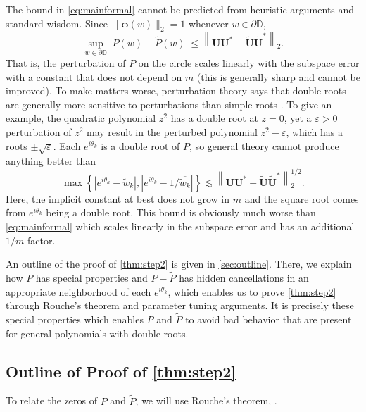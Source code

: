 \documentclass[11pt]{article}
\theoremstyle{definition}
\numberwithin{theorem}{section}
\numberwithin{equation}{section}
\def\D{\mathbb{D}}
\renewcommand{\tilde}{\widetilde}
\renewcommand{\epsilon}{\varepsilon}
\newcommand{\bfU}{{\boldsymbol U}}
\newcommand{\bfphi}{{\boldsymbol \phi}}
\numberwithin{equation}{section}
\begin{document}
The bound in \eqref{eq:mainformal} cannot be predicted from heuristic arguments and standard wisdom. Since $\|\bfphi(w)\|_2=1$ whenever $w\in\partial\D$, 
$$
\sup_{w\in \partial\D} |P(w)-\tilde P(w)|
\leq \left\|\bfU\bfU^*- \tilde \bfU \tilde\bfU^* \right\|_2.
$$
That is, the perturbation of $P$ on the circle scales linearly with the subspace error with a constant that does not depend on $m$ (this is generally sharp and cannot be improved). To make matters worse, perturbation theory says that double roots are generally more sensitive to perturbations than simple roots \cite{simmonds1998first} . To give an example, the quadratic polynomial $z^2$ has a double root at $z=0$, yet a $\epsilon>0$ perturbation of $z^2$ may result in the perturbed polynomial $z^2-\epsilon$, which has a roots $\pm \sqrt \epsilon$. Each $e^{i\theta_k}$ is a double root of $P$, so general theory cannot produce anything better than
$$
\max\left\{ \left| e^{i\theta_k} -\tilde w_k \right|, \left| e^{i\theta_k} - 1/\overline{\tilde w_k}\right| \right\}\lesssim \left\|\bfU\bfU^*- \tilde \bfU \tilde\bfU^* \right\|_2^{1/2}. 
$$
Here, the implicit constant at best does not grow in $m$ and the square root comes from $e^{i\theta_k}$ being a double root. This bound is obviously much worse than \eqref{eq:mainformal} which scales linearly in the subspace error and has an additional $1/m$ factor. 

An outline of the proof of \cref{thm:step2} is given in \cref{sec:outline}. There, we explain how $P$ has special properties and $P-\tilde P$ has hidden cancellations in an appropriate neighborhood of each $e^{i\theta_k}$, which enables us to prove \cref{thm:step2} through Rouche's theorem and parameter tuning arguments. It is precisely these special properties which enables $P$ and $\tilde P$ to avoid bad behavior that are present for general polynomials with double roots.

    
\subsection{Outline of Proof of \cref{thm:step2}}
\label{sec:outline1} 

To relate the zeros of $P$ and $\tilde P$, we will use Rouche's theorem, \cite[page 153]{ahlfors1979complex}. 
\end{document}
